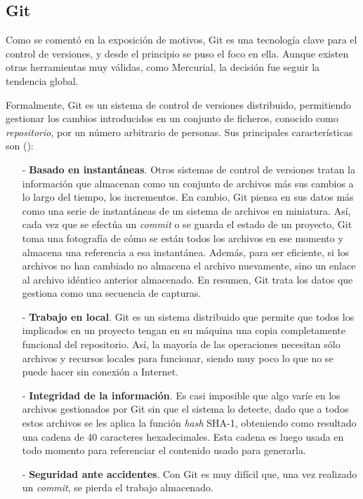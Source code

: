\documentclass[a4paper,12pt,twoside,openright]{report}
\begin{document}
    \subsection{Git}
    Como se comentó en la exposición de motivos, Git es una tecnología clave para el control de versiones, y desde el principio se puso el foco en ella. Aunque existen otras herramientas muy válidas, como Mercurial, la decisión fue seguir la tendencia global.
    
    Formalmente, Git es un sistema de control de versiones distribuido, permitiendo gestionar los cambios introducidos en un conjunto de ficheros, conocido como \emph{repositorio}, por un número arbitrario de personas. Sus principales características son (\cite{ScottChacon2014}):
    
    \begin{itemize}
    	\item[-] \textbf{Basado en instantáneas}. Otros sistemas de control de versiones tratan la información que almacenan como un conjunto de archivos más sus cambios a lo largo del tiempo, los incrementos. En cambio, Git piensa en sus datos más como una serie de instantáneas de un sistema de archivos en miniatura. Así, cada vez que se efectúa un \emph{commit} o se guarda el estado de un proyecto, Git toma una fotografía de cómo se están todos los archivos en ese momento y almacena una referencia a esa instantánea. Además, para ser eficiente, si los archivos no han cambiado no almacena el archivo nuevamente, sino un enlace al archivo idéntico anterior almacenado. En resumen, Git trata los datos que gestiona como una secuencia de capturas.
    	\item[-] \textbf{Trabajo en local}. Git es un sistema distribuido que permite que todos los implicados en un proyecto tengan en su máquina una copia completamente funcional del repositorio. Así, la mayoría de las operaciones necesitan sólo archivos y recursos locales para funcionar, siendo muy poco lo que no se puede hacer sin conexión a Internet. 
    	\item[-] \textbf{Integridad de la información}. Es casi imposible que algo varíe en los archivos gestionados por Git sin que el sistema lo detecte, dado que a todos estos archivos se les aplica la función \emph{hash} SHA-1, obteniendo como resultado una cadena de 40 caracteres hexadecimales. Esta cadena es luego usada en todo momento para referenciar el contenido usado para generarla.
    	\item[-] \textbf{Seguridad ante accidentes}. Con Git es muy difícil que, una vez realizado un \emph{commit}, se pierda el trabajo almacenado.
    \end{itemize}
    
\end{document}
